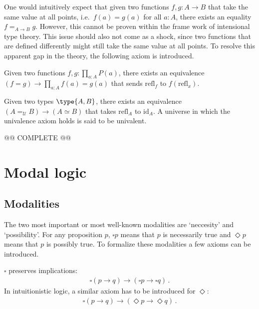     One would intuitively expect that given two functions $f,g:A\rightarrow B$ that take the same value at all points, i.e.~$f(a)=g(a)$ for all $a:A$, there exists an equality $f=_{A\rightarrow B}g$. However, this cannot be proven within the frame work of intensional type theory. This issue should also not come as a shock, since two functions that are defined differently might still take the same value at all points. To resolve this apparent gap in the theory, the following axiom is introduced.
    \begin{axiom}
        Given two functions $f,g:\prod_{a:A}P(a)$, there exists an equivalence $(f=g)\rightarrow\prod_{a:A}f(a)=g(a)$ that sends $\mathrm{refl}_f$ to $f(\mathrm{refl}_x)$.
    \end{axiom}
    \begin{axiom}
        Given two types $\type{A,B}$, there exists an equivalence $(A=_{\mathcal{U}}B)\rightarrow(A\simeq B)$ that takes $\mathrm{refl}_A$ to $\mathrm{id}_A$. A universe in which the univalence axiom holds is said to be univalent.
    \end{axiom}

    @@ COMPLETE @@

\section{Modal logic}
\subsection{Modalities}

    The two most important or most well-known modalities are `neccesity' and `possibility'. For any proposition $p$, $\square p$ means that $p$ is necessarily true and $\Diamond p$ means that $p$ is possibly true. To formalize these modalities a few axioms can be introduced.

    \begin{axiom}[K]
        $\square$ preserves implications:
        \begin{gather}
            \square(p\rightarrow q)\rightarrow(\square p\rightarrow\square q)\,.
        \end{gather}
        In intuitionistic logic, a similar axiom has to be introduced for $\Diamond$:
        \begin{gather}
            \square(p\rightarrow q)\rightarrow(\Diamond p\rightarrow\Diamond q)\,.
        \end{gather}
    \end{axiom}

